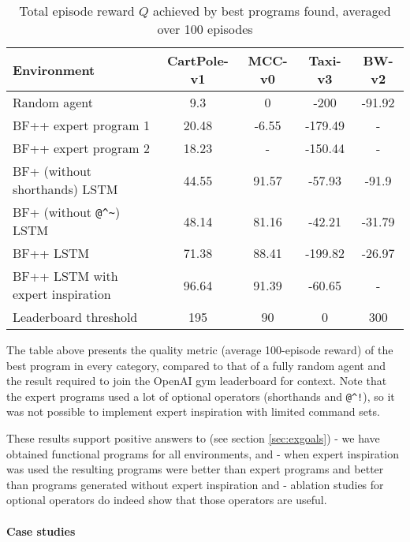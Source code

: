 \begin{table}[H]
  \caption{Total episode reward $Q$ achieved by best programs found, averaged over 100 episodes}
  \label{tab:quality}
  \centering
  \begin{tabular}{lcccc}
    Environment     & CartPole-v1     & MCC-v0 & Taxi-v3 & BW-v2 \\
    \midrule
    Random agent & 9.3 & 0 & -200 & -91.92  \\
    \midrule
    BF++ expert program 1 & 20.48 & -6.55 & -179.49 & - \\
    BF++ expert program 2 & 18.23 & - & -150.44 & - \\
    BF+ (without shorthands) LSTM & 44.55 & 91.57 & -57.93 & -91.9 \\
    BF+ (without \verb|@^~|) LSTM & 48.14 & 81.16 & -42.21 & -31.79 \\
    BF++ LSTM     & 71.38 & 88.41 & -199.82 & -26.97 \\
    BF++ LSTM with expert inspiration  & 96.64 & 91.39 & -60.65 & - \\
    \midrule
    Leaderboard threshold & 195 & 90 & 0 & 300 \\
    \bottomrule
  \end{tabular}
\end{table}

The table above presents the quality metric (average 100-episode reward) of the best program in every category, compared to that of a fully random agent and the result required to join the OpenAI gym leaderboard for context.
Note that the expert programs used a lot of optional operators (shorthands and \verb|@^!|), so it was not possible to implement expert inspiration with limited command sets.

These results support positive answers to (see section \ref{sec:exgoals}) \rqbfpp - we have obtained functional programs for all environments, and \rqbfppexpert - when expert inspiration was used the resulting programs were better than expert programs and better than programs generated without expert inspiration and \rqbfppablation - ablation studies for optional operators do indeed show that those operators are useful.

\paragraph{Case studies}
\label{sec:casestudies}

